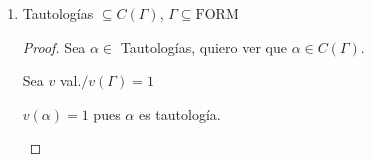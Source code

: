 \begin{enumerate}
\begin{enumerate}
\begin{proof}
        \begin{itemize}
            \item $\subseteq$) Es trivial por definición.
            \item $\supseteq$) Supongo
                $\exists \; \alpha \in \mathrm{FORM} / \alpha \notin C(\Gamma)$
                \begin{gather*}
                    \exists \; v \text{ valuación}/v(\alpha)=0 
                    \text{ y } \overbrace{v(\Gamma) = 1}^{\text{¡Absurdo!}}
                \end{gather*}

                \medskip

                $v(\Gamma)=1$ es absurdo pues $\Gamma$ es insatisfacible.

                El mismo vino de suponer que había una fórmula que no está
                en las consecuencias de $\Gamma$.
        \end{itemize}

        De esta manera probamos que $C(\Gamma)$ son todas las fórmulas.

        \end{proof}

        \bigskip

        Otra manera:
        \begin{proof} \phantom{.}
        
            Sea $v$ valuación.

            \begin{gather*}
                \underbrace{(\underbrace{v(\Gamma) = 1}_{\text{Falso}}
                \implies v(\alpha) = 1)}_{\text{Verdadero}}
            \end{gather*}
        \end{proof}

    \item Tautologías $\subseteq C(\Gamma)$, $\Gamma \subseteq \mathrm{FORM}$

    \begin{proof} \phantom{.}
    
        Sea $\alpha \in$ Tautologías, quiero ver que $\alpha \in C(\Gamma)$.

        Sea $v$ val.$/v(\Gamma) = 1$

        \begin{center}
            $v(\alpha)=1$ pues $\alpha$ es tautología.
        \end{center}
    \end{proof}
\end{enumerate}

\end{enumerate}

